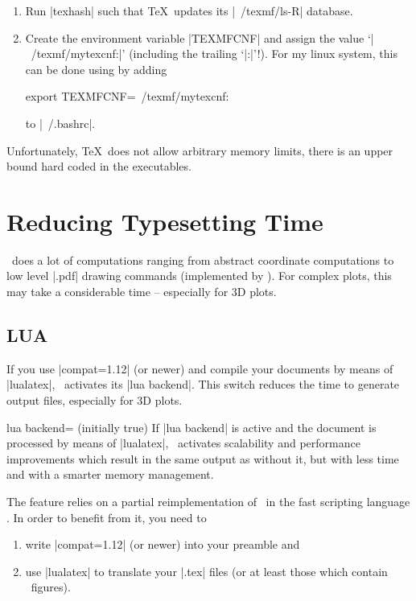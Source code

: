 {\begin{enumerate}
\begin{codeexample}[code only]
\end{codeexample}
	\item Run |texhash| such that \TeX\ updates its |~/texmf/ls-R| database.
	\item Create the environment variable |TEXMFCNF| and assign the value `|~/texmf/mytexcnf:|' (including the trailing `|:|'!). For my linux system, this can be done using by adding
\begin{codeexample}
export TEXMFCNF=~/texmf/mytexcnf:
\end{codeexample}
	to |~/.bashrc|.
\end{enumerate}

Unfortunately, \TeX\ does not allow arbitrary memory limits, there is an upper bound hard coded in the executables.

\section{Reducing Typesetting Time}
\PGFPlots\ does a lot of computations ranging from abstract coordinate computations to low level |.pdf| drawing commands (implemented by \PGF). For complex plots, this may take a considerable time -- especially for 3D plots.

\subsection{LUA}
If you use |compat=1.12| (or newer) and compile your documents by means of |lualatex|, \PGFPlots\ activates its |lua backend|. This switch reduces the time to generate output files, especially for 3D plots.

\begin{pgfplotskey}{lua backend= (initially true)}
	If |lua backend| is active and the document is processed by means of |lualatex|, \PGFPlots\ activates scalability and performance improvements which result in the same output as without it, but with less time and with a smarter memory management.
	
	The feature relies on a partial reimplementation of \PGFPlots\ in the fast scripting language \lua. In order to benefit from it, you need to
	\begin{enumerate}
		\item write |compat=1.12| (or newer) into your preamble and
		\item use |lualatex| to translate your |.tex| files (or at least those which contain \PGFPlots\ figures).
	\end{enumerate}


\end{pgfplotskey}}
